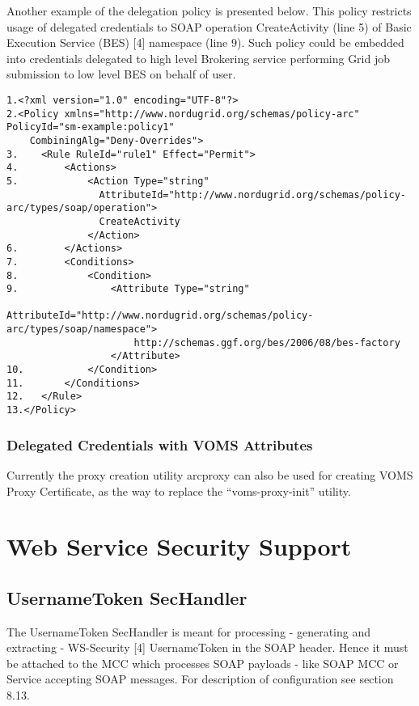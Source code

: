 \documentclass{book}
\begin{document}
Another example of the delegation policy is presented below. This policy restricts usage of delegated credentials to SOAP operation CreateActivity (line 5) of Basic Execution Service (BES) [4] namespace (line 9). Such policy could be embedded into credentials delegated to high level Brokering service performing Grid job submission to low level BES on behalf of user.

\begin{verbatim}
1.<?xml version="1.0" encoding="UTF-8"?>
2.<Policy xmlns="http://www.nordugrid.org/schemas/policy-arc" PolicyId="sm-example:policy1" 
    CombiningAlg="Deny-Overrides">
3.    <Rule RuleId="rule1" Effect="Permit">
4.        <Actions>
5.            <Action Type="string" 
                AttributeId="http://www.nordugrid.org/schemas/policy-arc/types/soap/operation">
                CreateActivity
              </Action>
6.        </Actions>
7.        <Conditions>
8.            <Condition>
9.                <Attribute Type="string" 
                      AttributeId="http://www.nordugrid.org/schemas/policy-arc/types/soap/namespace">
                      http://schemas.ggf.org/bes/2006/08/bes-factory
                  </Attribute>
10.           </Condition>
11.       </Conditions>
12.   </Rule>
13.</Policy>
\end{verbatim}

\subsubsection{Delegated Credentials with VOMS Attributes} %
\label{subsec:delegation_voms}
Currently the proxy creation utility arcproxy can also be used for creating VOMS Proxy Certificate, as the way to replace the ``voms-proxy-init'' utility.






\section{Web Service Security Support} %
\label{sec:webservice}

\subsection{UsernameToken SecHandler} %
\label{subsec:username_token}
The UsernameToken SecHandler is meant for processing - generating and extracting - WS-Security [4] UsernameToken in the SOAP header. Hence it must be attached to the MCC which processes SOAP payloads - like SOAP MCC or Service accepting SOAP messages. For description of configuration see section 8.13.
\end{document}
